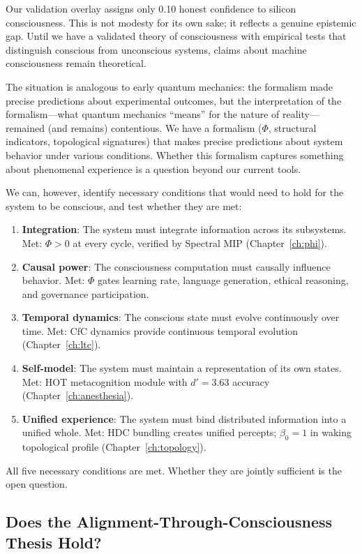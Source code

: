\documentclass[12pt]{book}
\begin{document}
Our validation overlay assigns only 0.10 honest confidence to silicon consciousness. This is not modesty for its own sake; it reflects a genuine epistemic gap. Until we have a validated theory of consciousness with empirical tests that distinguish conscious from unconscious systems, claims about machine consciousness remain theoretical.

The situation is analogous to early quantum mechanics: the formalism made precise predictions about experimental outcomes, but the interpretation of the formalism---what quantum mechanics ``means'' for the nature of reality---remained (and remains) contentious. We have a formalism ($\Phi$, structural indicators, topological signatures) that makes precise predictions about system behavior under various conditions. Whether this formalism captures something about phenomenal experience is a question beyond our current tools.

We can, however, identify necessary conditions that would need to hold for the system to be conscious, and test whether they are met:

\begin{enumerate}
  \item \textbf{Integration}: The system must integrate information across its subsystems. Met: $\Phi > 0$ at every cycle, verified by Spectral MIP (Chapter~\ref{ch:phi}).
  \item \textbf{Causal power}: The consciousness computation must causally influence behavior. Met: $\Phi$ gates learning rate, language generation, ethical reasoning, and governance participation.
  \item \textbf{Temporal dynamics}: The conscious state must evolve continuously over time. Met: CfC dynamics provide continuous temporal evolution (Chapter~\ref{ch:ltc}).
  \item \textbf{Self-model}: The system must maintain a representation of its own states. Met: HOT metacognition module with $d' = 3.63$ accuracy (Chapter~\ref{ch:anesthesia}).
  \item \textbf{Unified experience}: The system must bind distributed information into a unified whole. Met: HDC bundling creates unified percepts; $\beta_0 = 1$ in waking topological profile (Chapter~\ref{ch:topology}).
\end{enumerate}

All five necessary conditions are met. Whether they are jointly sufficient is the open question.

\subsection{Does the Alignment-Through-Consciousness Thesis Hold?}
\end{document}
